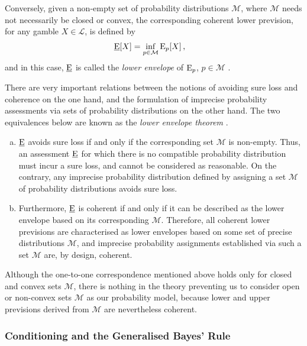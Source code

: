 Conversely, given a non-empty set of probability distributions $\mathcal{M}$,
where $\mathcal{M}$ needs not necessarily be closed or convex,
the corresponding coherent lower prevision, for any gamble $X \in \mathcal{L}$,
is defined by
\begin{align*}
\underline{\operatorname{E}}[X] &= \inf_{p \in \mathcal{M}} \operatorname{E}_p[X]\,,
\end{align*}
and in this case, $\underline{\operatorname{E}}$ is called the \emph{lower envelope} of $\operatorname{E}_p$, $p \in \mathcal{M}$
\parencite[p.~132]{1991:walley}.

There are very important relations between the notions of avoiding sure loss and coherence on the one hand,
and the formulation of imprecise probability assessments via sets of probability distributions on the other hand.
The two equivalences below are known as the \emph{lower envelope theorem} \parencite[\S 3.3.3]{1991:walley}.
\begin{enumerate}[(a)]
\item $\underline{\operatorname{E}}$ avoids sure loss if and only if the corresponding set $\mathcal{M}$ is non-empty.
Thus, an assessment $\underline{\operatorname{E}}$ for which there is no compatible probability distribution
must incur a sure loss, and cannot be considered as reasonable.
On the contrary, any imprecise probability distribution defined by assigning
a set $\mathcal{M}$ of probability distributions avoids sure loss.
\item Furthermore, $\underline{\operatorname{E}}$ is coherent if and only if it can be
described as the lower envelope based on its corresponding $\mathcal{M}$.
Therefore, all coherent lower previsions are characterised as
lower envelopes based on some set of precise distributions $\mathcal{M}$,
and imprecise probability assignments established via such a set $\mathcal{M}$
are, by design, coherent.
\end{enumerate}

Although the one-to-one correspondence mentioned above holds only for closed and convex sets $\mathcal{M}$,
there is nothing in the theory preventing us to consider
open or non-convex sets $\mathcal{M}$ as our probability model, %
because lower and upper previsions derived from $\mathcal{M}$ are nevertheless coherent.

%
%

\subsubsection{Conditioning and the Generalised Bayes' Rule}

